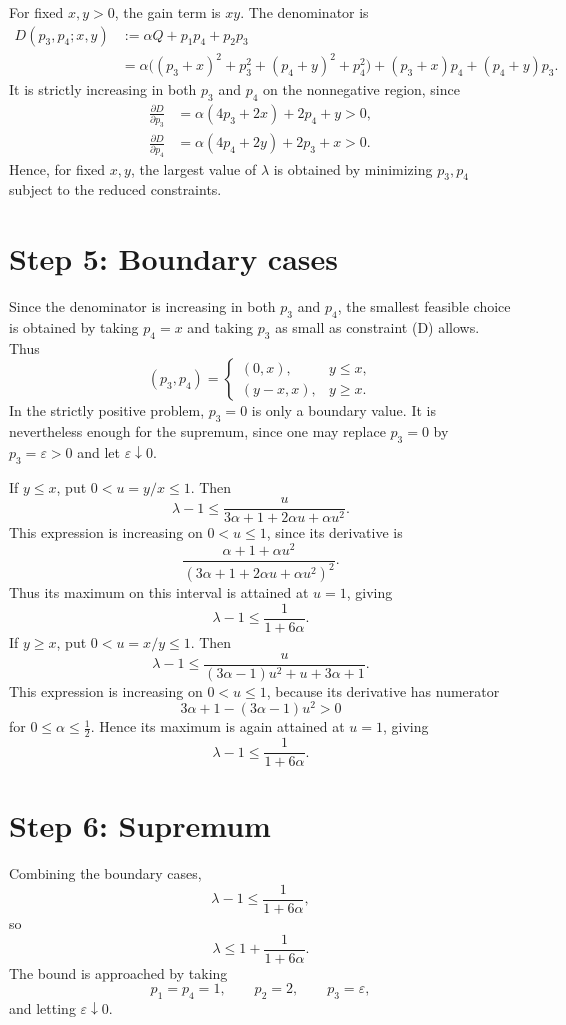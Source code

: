 \documentclass[11pt]{article}
\begin{document}
For fixed \(x,y>0\), the gain term is \(xy\). The denominator is
\begin{align*}
D(p_3,p_4;x,y)
&:=\alpha Q+p_1p_4+p_2p_3\\
&=\alpha\bigl({(p_3+x)}^2+p_3^2+{(p_4+y)}^2+p_4^2\bigr)
 +(p_3+x)p_4+(p_4+y)p_3.
\end{align*}
It is strictly increasing in both \(p_3\) and \(p_4\) on the nonnegative region, since
\begin{align*}
\frac{\partial D}{\partial p_3}
&=\alpha(4p_3+2x)+2p_4+y>0,\\
\frac{\partial D}{\partial p_4}
&=\alpha(4p_4+2y)+2p_3+x>0.
\end{align*}
Hence, for fixed \(x,y\), the largest value of \(\lambda\) is obtained by minimizing \(p_3,p_4\) subject to the reduced constraints.

\section*{Step 5: Boundary cases}

Since the denominator is increasing in both \(p_3\) and \(p_4\), the smallest feasible choice is obtained by taking \(p_4=x\) and taking \(p_3\) as small as constraint (D) allows. Thus
\[
(p_3,p_4)=
\begin{cases}
(0,x), & y\le x,\\
(y-x,x), & y\ge x.
\end{cases}
\]
In the strictly positive problem, \(p_3=0\) is only a boundary value. It is nevertheless enough for the supremum, since one may replace \(p_3=0\) by \(p_3=\varepsilon>0\) and let \(\varepsilon\downarrow 0\).

If \(y\le x\), put \(0<u=y/x\le 1\). Then
\[
\lambda-1
\le
\frac{u}{3\alpha+1+2\alpha u+\alpha u^2}.
\]
This expression is increasing on \(0<u\le 1\), since its derivative is
\[
\frac{\alpha +1+ \alpha u^2}{{(3\alpha+1+2\alpha u+\alpha u^2)}^2}.
\]
Thus its maximum on this interval is attained at \(u=1\), giving
\[
\lambda-1\le \frac{1}{1+6\alpha}.
\]
If \(y\ge x\), put \(0<u=x/y\le 1\). Then
\[
\lambda-1
\le
\frac{u}{(3\alpha-1)u^2+u+3\alpha+1}.
\]
This expression is increasing on \(0<u\le 1\), because its derivative has numerator
\[
3\alpha+1-(3\alpha-1)u^2>0
\]
for \(0\le\alpha\le\tfrac12\). Hence its maximum is again attained at \(u=1\), giving
\[
\lambda-1\le \frac{1}{1+6\alpha}.
\]

\section*{Step 6: Supremum}

Combining the boundary cases,
\[
\lambda-1\le \frac{1}{1+6\alpha},
\]
so
\[
\lambda\le 1+\frac{1}{1+6\alpha}.
\]
The bound is approached by taking
\[
p_1=p_4=1,\qquad p_2=2,\qquad p_3=\varepsilon,
\]
and letting \(\varepsilon\downarrow 0\).
\end{document}
